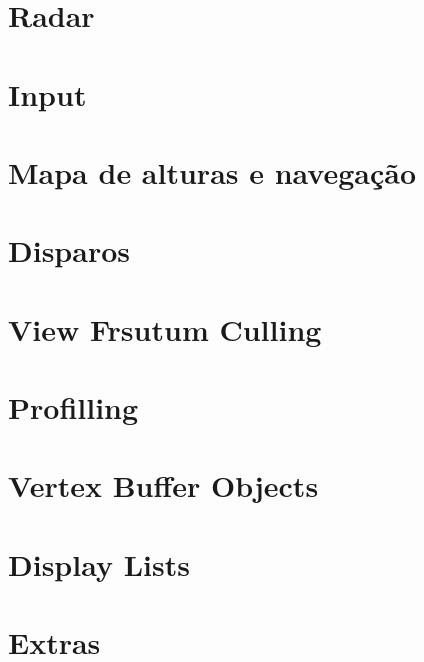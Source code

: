 \documentclass[12pt,a4paper,portuges]{style/myreport}
\begin{document}
\newpage

\chapter{Radar}


\newpage

\chapter{Input}


\newpage	

\chapter{Mapa de alturas e navegação}


\chapter{Disparos}

\newpage

\chapter{View Frsutum Culling}


\newpage

\chapter{Profilling}


\newpage

\chapter{Vertex Buffer Objects}


\chapter{Display Lists}


\chapter{Extras}
\end{document}
